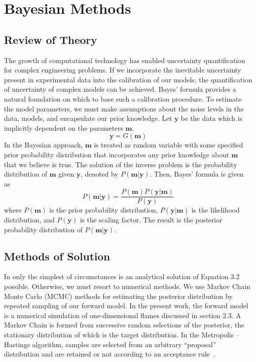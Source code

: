\chapter{Bayesian Methods}\label{chap:bayes}
\section{Review of Theory}

The growth of computational technology has enabled uncertainty
quantification for complex engineering problems. If we incorporate the
inevitable uncertainty present in experimental
data into the calibration of our models, the quantification of
uncertainty of complex models can be
achieved. Bayes' formula provides a natural foundation on which to
base such a calibration procedure.
To estimate the model parameters, we must make
assumptions about the noise levels in the data, models, and
encapsulate our prior knowledge. Let
$\mathbf{y}$ be the data which is implicitly dependent on the parameters $\mathbf{m}$.
%
\begin{equation}
  \mathbf{y} = G(\mathbf{m})
\end{equation}
%
  In the Bayesian approach, $\mathbf{m}$ is treated as random variable with some
  specified prior probability distribution that incorporates any prior
  knowledge about $\mathbf{m}$ that we believe is true. The solution of the inverse problem is the
  probability distribution of $\mathbf{m}$ given $\mathbf{y}$, denoted by $P(\mathbf{m}|\mathbf{y})$. Then, Bayes'
  formula is given as~\cite{Sivia}
  \begin{equation}
    P(\mathbf{m}|\mathbf{y}) = \frac{P(\mathbf{m}) P(\mathbf{y}|\mathbf{m})}{P(\mathbf{y})}
  \end{equation}
%
 where $P(\mathbf{m})$ is the prior probability distribution, $P(\mathbf{y}|\mathbf{m})$
 is the likelihood distribution, and $P(\mathbf{y})$ is the scaling factor.
 The result is the posterior probability distribution of $P(\mathbf{m}|\mathbf{y})$.

\section{Methods of Solution}

In only the simplest of circumstances is an analytical solution of Equation 3.2
possible. Otherwise, we must resort to numerical methods.
 We use Markov Chain Monte Carlo (MCMC) methods for estimating the posterior
 distribution by repeated sampling of our forward model. In the
 present work, the forward model is a numerical simulation of
 one-dimensional flames discussed in section 2.3. A Markov Chain is formed from successive
 random selections of the posterior, the stationary distribution of which is the target
 distribution. In the Metropolis – Hastings algorithm, samples are
 selected from an arbitrary “proposal” distribution and are retained
 or not according to an acceptance rule~\cite{RobertCasella2004}.

